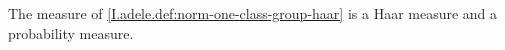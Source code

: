 The measure of \cref{I.adele.def:norm-one-class-group-haar} is a Haar measure and a probability measure.
